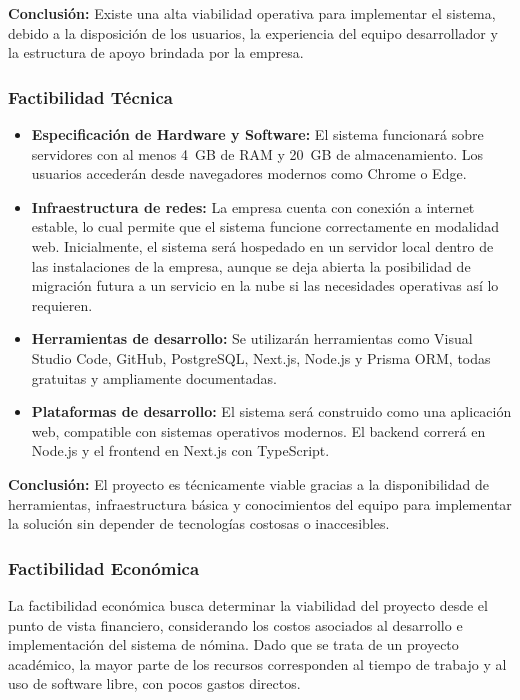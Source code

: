 \textbf{Conclusión:} Existe una alta viabilidad operativa para implementar el sistema, debido a la disposición de los usuarios, la experiencia del equipo desarrollador y la estructura de apoyo brindada por la empresa.

\subsubsection{Factibilidad Técnica}

\begin{itemize}
	\item \textbf{Especificación de Hardware y Software:} El sistema funcionará sobre servidores con al menos 4~GB de RAM y 20~GB de almacenamiento. Los usuarios accederán desde navegadores modernos como Chrome o Edge.

	\item \textbf{Infraestructura de redes:} La empresa cuenta con conexión a internet estable, lo cual permite que el sistema funcione correctamente en modalidad web. Inicialmente, el sistema será hospedado en un servidor local dentro de las instalaciones de la empresa, aunque se deja abierta la posibilidad de migración futura a un servicio en la nube si las necesidades operativas así lo requieren.

	\item \textbf{Herramientas de desarrollo:} Se utilizarán herramientas como Visual Studio Code, GitHub, PostgreSQL, Next.js, Node.js y Prisma ORM, todas gratuitas y ampliamente documentadas.

	\item \textbf{Plataformas de desarrollo:} El sistema será construido como una aplicación web, compatible con sistemas operativos modernos. El backend correrá en Node.js y el frontend en Next.js con TypeScript.
\end{itemize}

\textbf{Conclusión:} El proyecto es técnicamente viable gracias a la disponibilidad de herramientas, infraestructura básica y conocimientos del equipo para implementar la solución sin depender de tecnologías costosas o inaccesibles.

\subsubsection{Factibilidad Económica}

La factibilidad económica busca determinar la viabilidad del proyecto desde el punto de vista financiero, considerando los costos asociados al desarrollo e implementación del sistema de nómina.
Dado que se trata de un proyecto académico, la mayor parte de los recursos corresponden al tiempo de trabajo y al uso de software libre, con pocos gastos directos.

